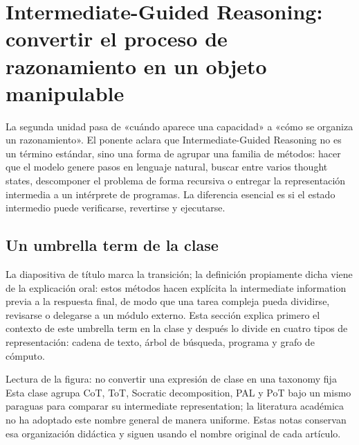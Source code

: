 \section{Intermediate-Guided Reasoning: convertir el proceso de razonamiento en un objeto manipulable}

La segunda unidad pasa de «cuándo aparece una capacidad» a «cómo se organiza un razonamiento». El ponente aclara que Intermediate-Guided Reasoning no es un término estándar, sino una forma de agrupar una familia de métodos: hacer que el modelo genere pasos en lenguaje natural, buscar entre varios thought states, descomponer el problema de forma recursiva o entregar la representación intermedia a un intérprete de programas. La diferencia esencial es si el estado intermedio puede verificarse, revertirse y ejecutarse.

\subsection{Un umbrella term de la clase}

La diapositiva de título marca la transición; la definición propiamente dicha viene de la explicación oral: estos métodos hacen explícita la intermediate information previa a la respuesta final, de modo que una tarea compleja pueda dividirse, revisarse o delegarse a un módulo externo. Esta sección explica primero el contexto de este umbrella term en la clase y después lo divide en cuatro tipos de representación: cadena de texto, árbol de búsqueda, programa y grafo de cómputo.


\begin{knowledgebox}{Lectura de la figura: no convertir una expresión de clase en una taxonomy fija}
Esta clase agrupa CoT, ToT, Socratic decomposition, PAL y PoT bajo un mismo paraguas para comparar su intermediate representation; la literatura académica no ha adoptado este nombre general de manera uniforme. Estas notas conservan esa organización didáctica y siguen usando el nombre original de cada artículo.
\end{knowledgebox}


